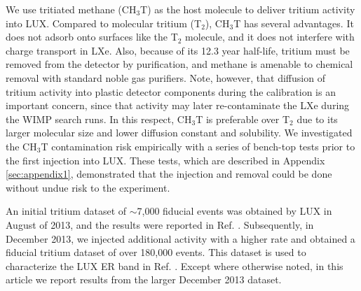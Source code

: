 We use tritiated methane (CH$_3$T) as the host molecule to deliver tritium activity into LUX. Compared to molecular tritium (T$_2$), CH$_3$T has several advantages. It does not adsorb onto surfaces like the T$_2$ molecule, and it does not interfere with charge transport in LXe. Also, because of its 12.3 year half-life, tritium must be removed from the detector by purification, and methane is amenable to chemical removal with standard noble gas purifiers\cite{Dobi_CH4}. Note, however, that diffusion of tritium activity into plastic detector components during the calibration is an important concern, since that activity may later re-contaminate the LXe during the WIMP search runs.  In this respect, CH$_3$T is preferable over T$_2$ due to its larger molecular size and lower diffusion constant and solubility\cite{miyake:1983}. We investigated the CH$_3$T contamination risk empirically with a series of bench-top tests prior to the first injection into LUX. These tests, which are described in Appendix \ref{sec:appendix1}, demonstrated that the injection and removal could be done without undue risk to the experiment. 

An initial tritium dataset of $\sim$7,000 fiducial events was obtained by LUX in August of 2013, and the results were reported in Ref. \cite{lux-prl}. Subsequently, in December 2013, we injected additional activity with a higher rate and obtained a fiducial tritium dataset of over 180,000 events. This dataset is used to characterize the LUX ER band in Ref. \cite{lux-reanalysis}. Except where otherwise noted, in this article we report results from the larger December 2013 dataset.